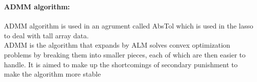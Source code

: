 \documentclass[12pt,a4paper]{article}
\begin{document}
\noindent \textbf{ADMM algorithm:}\\\\
ADMM algorithm is used in an agrument called AbsTol which is used in the lasso to deal with tall array data.\\
ADMM is the algorithm that expands by ALM solves convex optimization problems by breaking them into smaller pieces, each of which are then easier to handle. It is aimed to make up the shortcomings of secondary punishment to make the algorithm more stable\\
\end{document}
